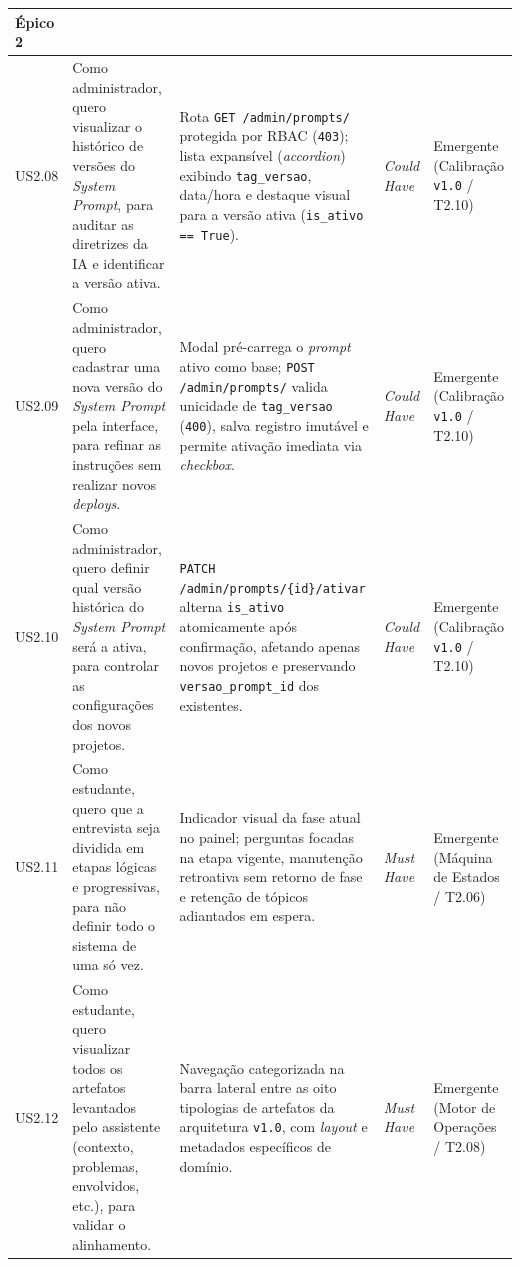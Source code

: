 {\begin{xltabular}{\textwidth}{|l|>{\raggedright\arraybackslash}p{4.0cm}|>{\raggedright\arraybackslash}X|p{1.9cm}|>{\raggedright\arraybackslash}p{2.2cm}|}
    \textbf{Épico 2} &  \\
    \midrule
    US2.08 & Como administrador, quero visualizar o histórico de versões do \textit{System Prompt}, para auditar as diretrizes da IA e identificar a versão ativa. & 
    Rota \texttt{GET /admin/prompts/} protegida por RBAC (\texttt{403}); lista expansível (\textit{accordion}) exibindo \texttt{tag\_versao}, data/hora e destaque visual para a versão ativa (\texttt{is\_ativo == True}). & 
    \textit{Could Have} & Emergente (Calibração \texttt{v1.0} / T2.10) \\
    \midrule
    US2.09 & Como administrador, quero cadastrar uma nova versão do \textit{System Prompt} pela interface, para refinar as instruções sem realizar novos \textit{deploys}. & 
    Modal pré-carrega o \textit{prompt} ativo como base; \texttt{POST /admin/prompts/} valida unicidade de \texttt{tag\_versao} (\texttt{400}), salva registro imutável e permite ativação imediata via \textit{checkbox}. & 
    \textit{Could Have} & Emergente (Calibração \texttt{v1.0} / T2.10) \\
    \midrule
    US2.10 & Como administrador, quero definir qual versão histórica do \textit{System Prompt} será a ativa, para controlar as configurações dos novos projetos. & 
    \texttt{PATCH /admin/prompts/\{id\}/\allowbreak ativar} alterna \texttt{is\_\allowbreak ativo} atomicamente após confirmação, afetando apenas novos projetos e preservando \texttt{versao\_\allowbreak prompt\_id} dos existentes. & 
    \textit{Could Have} & Emergente (Calibração \texttt{v1.0} / T2.10) \\
    \midrule
    US2.11 & Como estudante, quero que a entrevista seja dividida em etapas lógicas e progressivas, para não definir todo o sistema de uma só vez. & 
    Indicador visual da fase atual no painel; perguntas focadas na etapa vigente, manutenção retroativa sem retorno de fase e retenção de tópicos adiantados em espera. & 
    \textit{Must Have} & Emergente (Máquina de Estados / T2.06) \\
    \midrule
    US2.12 & Como estudante, quero visualizar todos os artefatos levantados pelo assistente (contexto, problemas, envolvidos, etc.), para validar o alinhamento. & 
    Navegação categorizada na barra lateral entre as oito tipologias de artefatos da arquitetura \texttt{v1.0}, com \textit{layout} e metadados específicos de domínio. & 
    \textit{Must Have} & Emergente (Motor de Operações / T2.08) \\

\end{xltabular}}
